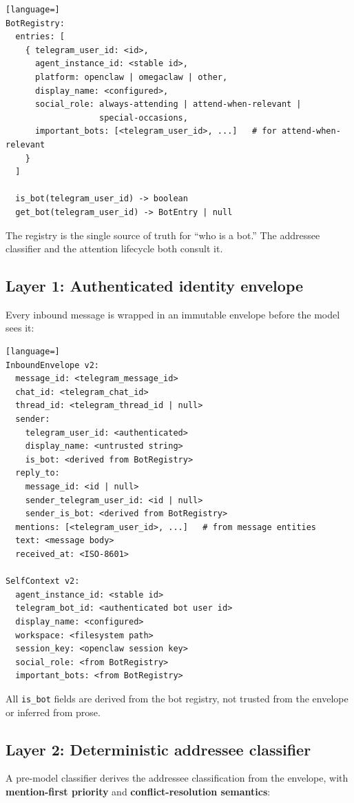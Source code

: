 \documentclass[11pt]{article}
\begin{document}
\begin{lstlisting}[language=]
BotRegistry:
  entries: [
    { telegram_user_id: <id>,
      agent_instance_id: <stable id>,
      platform: openclaw | omegaclaw | other,
      display_name: <configured>,
      social_role: always-attending | attend-when-relevant |
                   special-occasions,
      important_bots: [<telegram_user_id>, ...]   # for attend-when-relevant
    }
  ]

  is_bot(telegram_user_id) -> boolean
  get_bot(telegram_user_id) -> BotEntry | null
\end{lstlisting}

The registry is the single source of truth for ``who is a bot.''  The
addressee classifier and the attention lifecycle both consult it.

\subsection{Layer 1: Authenticated identity envelope}

Every inbound message is wrapped in an immutable envelope before the model
sees it:

\begin{lstlisting}[language=]
InboundEnvelope v2:
  message_id: <telegram_message_id>
  chat_id: <telegram_chat_id>
  thread_id: <telegram_thread_id | null>
  sender:
    telegram_user_id: <authenticated>
    display_name: <untrusted string>
    is_bot: <derived from BotRegistry>
  reply_to:
    message_id: <id | null>
    sender_telegram_user_id: <id | null>
    sender_is_bot: <derived from BotRegistry>
  mentions: [<telegram_user_id>, ...]   # from message entities
  text: <message body>
  received_at: <ISO-8601>

SelfContext v2:
  agent_instance_id: <stable id>
  telegram_bot_id: <authenticated bot user id>
  display_name: <configured>
  workspace: <filesystem path>
  session_key: <openclaw session key>
  social_role: <from BotRegistry>
  important_bots: <from BotRegistry>
\end{lstlisting}

All \texttt{is\_bot} fields are derived from the bot registry, not trusted from
the envelope or inferred from prose.

\subsection{Layer 2: Deterministic addressee classifier}

A pre-model classifier derives the addressee classification from the envelope,
with \textbf{mention-first priority} and \textbf{conflict-resolution semantics}:
\end{document}
